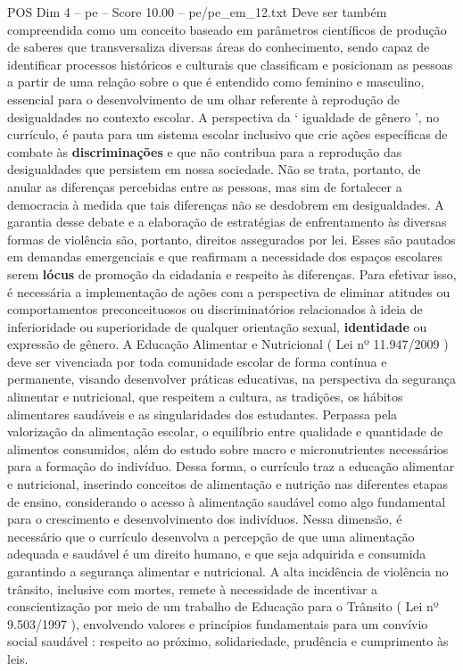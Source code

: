 \begin{textsample}{POS Dim 4 – pe – Score 10.00 – pe/pe\_em\_12.txt}
Deve ser também compreendida como um conceito baseado em parâmetros científicos de produção de saberes que transversaliza diversas áreas do conhecimento, sendo capaz de identificar processos históricos e culturais que classificam e posicionam as pessoas a partir de uma relação sobre o que é entendido como feminino e masculino, essencial para o desenvolvimento de um olhar referente à reprodução de desigualdades no contexto escolar.
A perspectiva da ‘ igualdade de gênero ’, no currículo, é pauta para um sistema escolar inclusivo que crie ações específicas de combate às \textbf{discriminações} e que não contribua para a reprodução das desigualdades que persistem em nossa sociedade.
Não se trata, portanto, de anular as diferenças percebidas entre as pessoas, mas sim de fortalecer a democracia à medida que tais diferenças não se desdobrem em desigualdades.
A garantia desse debate e a elaboração de estratégias de enfrentamento às diversas formas de violência são, portanto, direitos assegurados por lei.
Esses são pautados em demandas emergenciais e que reafirmam a necessidade dos espaços escolares serem \textbf{lócus} de promoção da cidadania e respeito às diferenças.
Para efetivar isso, é necessária a implementação de ações com a perspectiva de eliminar atitudes ou comportamentos preconceituosos ou discriminatórios relacionados à ideia de inferioridade ou superioridade de qualquer orientação sexual, \textbf{identidade} ou expressão de gênero.
A Educação Alimentar e Nutricional ( Lei nº 11.947/2009 ) deve ser vivenciada por toda comunidade escolar de forma contínua e permanente, visando desenvolver práticas educativas, na perspectiva da segurança alimentar e nutricional, que respeitem a cultura, as tradições, os hábitos alimentares saudáveis e as singularidades dos estudantes.
Perpassa pela valorização da alimentação escolar, o equilíbrio entre qualidade e quantidade de alimentos consumidos, além do estudo sobre macro e micronutrientes necessários para a formação do indivíduo.
Dessa forma, o currículo traz a educação alimentar e nutricional, inserindo conceitos de alimentação e nutrição nas diferentes etapas de ensino, considerando o acesso à alimentação saudável como algo fundamental para o crescimento e desenvolvimento dos indivíduos.
Nessa dimensão, é necessário que o currículo desenvolva a percepção de que uma alimentação adequada e saudável é um direito humano, e que seja adquirida e consumida garantindo a segurança alimentar e nutricional.
A alta incidência de violência no trânsito, inclusive com mortes, remete à necessidade de incentivar a conscientização por meio de um trabalho de Educação para o Trânsito ( Lei nº 9.503/1997 ), envolvendo valores e princípios fundamentais para um convívio social saudável : respeito ao próximo, solidariedade, prudência e cumprimento às leis.

\end{textsample}
